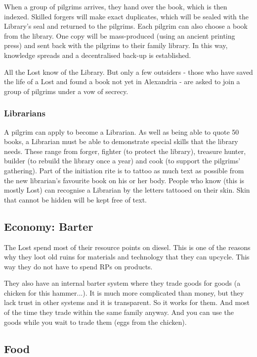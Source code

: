 When a group of pilgrims arrives, they hand over the book, which is then indexed. Skilled forgers will make exact duplicates, which will be sealed with the Library's seal and returned to the pilgrims. Each pilgrim can also choose a book from the library. One copy will be mass-produced (using an ancient printing press) and sent back with the pilgrims to their family library.
In this way, knowledge spreads and a decentralised back-up is established.

All the Lost know of the Library. But only a few outsiders - those who have saved the life of a Lost and found a book not yet in Alexandria - are asked to join a group of pilgrims under a vow of secrecy.

\subsubsection{Librarians}

A pilgrim can apply to become a Librarian. As well as being able to quote 50 books, a Librarian must be able to demonstrate special skills that the library needs. These range from forger, fighter (to protect the library), treasure hunter, builder (to rebuild the library once a year) and cook (to support the pilgrims' gathering).
Part of the initiation rite is to tattoo as much text as possible from the new librarian's favourite book on his or her body. People who know (this is mostly Lost) can recognise a Librarian by the letters tattooed on their skin.
Skin that cannot be hidden will be kept free of text.

\subsection{Economy: Barter}
\label{sec:Barter}
The Lost spend most of their resource points on diesel. This is one of the reasons why they loot old ruins for materials and technology that they can upcycle. This way they do not have to spend RPs on products.

They also have an internal barter system where they trade goods for goods (a chicken for this hammer...).
It is much more complicated than money, but they lack trust in other systems and it is transparent. So it works for them. And most of the time they trade within the same family anyway.
And you can use the goods while you wait to trade them (eggs from the chicken).

\subsection{Food}
\label{sec: lost food}

